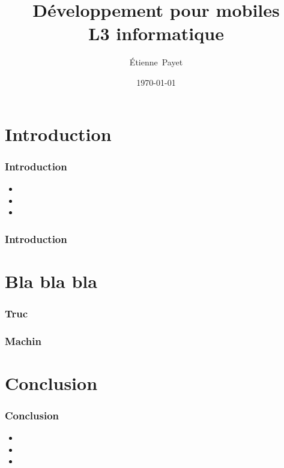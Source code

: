 \documentclass{beamer}
\title[Dev. Mobiles -- L3 info]{Développement pour mobiles\\L3 informatique}
\author{\'Etienne~Payet}
\institute[DI]{Département d'informatique}
\date{\today}
\begin{document}
\begin{frame}
  \titlepage
\end{frame}


\section{Introduction}
%
%
\begin{frame}
  \frametitle{Introduction}
  \begin{itemize}
    \item
    \item
    \item
  \end{itemize}
\end{frame}
%
%
\begin{frame}
  \frametitle{Introduction}
\end{frame}
%
%
\section{Bla bla bla}
%
%
\begin{frame}
  \frametitle{Truc}
\end{frame}
%
%
\begin{frame}
  \frametitle{Machin}
\end{frame}
%
%
\section{Conclusion}
%
%
\begin{frame}
  \frametitle{Conclusion}
  \begin{itemize}
    \item
    \item
    \item
  \end{itemize}
\end{frame}
%
%
\end{document}
